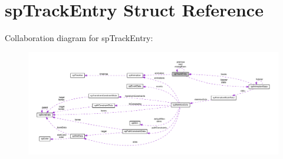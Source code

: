 \hypertarget{structspTrackEntry}{}\section{sp\+Track\+Entry Struct Reference}
\label{structspTrackEntry}


Collaboration diagram for sp\+Track\+Entry\+:
\nopagebreak
\begin{figure}[H]
\begin{center}
\leavevmode
\includegraphics[width=350pt]{structspTrackEntry__coll__graph}
\end{center}
\end{figure}
